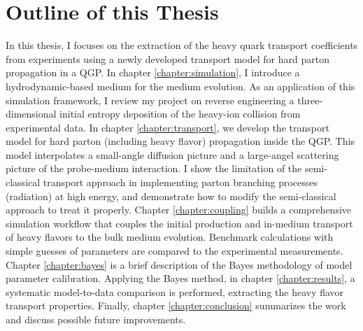 \section{Outline of this Thesis}
In this thesis, I focuses on the extraction of the heavy quark transport coefficients from experiments using a newly developed transport model for hard parton propagation in a QGP.
In chapter \ref{chapter:simulation}, I introduce a hydrodynamic-based medium for the medium evolution. 
As an application of this simulation framework, I review my project on reverse engineering a three-dimensional initial entropy deposition of the heavy-ion collision from experimental data. 
In chapter \ref{chapter:transport}, we develop the transport model for hard parton (including heavy flavor) propagation inside the QGP.
This model interpolates a small-angle diffusion picture and a large-angel scattering picture of the probe-medium interaction.
I show the limitation of the semi-classical transport approach in implementing parton branching processes (radiation) at high energy, and demonstrate how to modify the semi-classical approach to treat it properly.
Chapter \ref{chapter:coupling} builds a comprehensive simulation workflow that couples the initial production and in-medium transport of heavy flavors to the bulk medium evolution.
Benchmark calculations with simple guesses of parameters are compared to the experimental measurements.
Chapter \ref{chapter:bayes} is a brief description of the Bayes methodology of model parameter calibration.
Applying the Bayes method, in chapter \ref{chapter:results}, a systematic model-to-data comparison is performed, extracting the heavy flavor transport properties.
Finally, chapter \ref{chapter:conclusion} summarizes the work and discuss possible future improvements.


